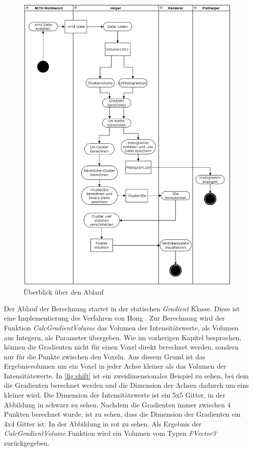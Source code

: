 \begin{figure}
\centering 
\includegraphics[width=\textwidth]{Logos/Ueberblick2.png}
\caption{Überblick über den Ablauf} 
\label{fig:ueberblick} 
\end{figure}


Der Ablauf der Berechnung startet in der statischen \textit{Gradient} Klasse. Diese ist eine Implementierung des Verfahren von Hong \cite{hong2003method}. Zur Berechnung wird der Funktion \textit{CalcGradientVolume} das Volumen der Intensitätswerte, als Volumen aus Integern, als Parameter übergeben. Wie im vorherigen Kapitel besprochen, können die Gradienten nicht für einen Voxel direkt berechnet werden, sondern nur für die Punkte zwischen den Voxeln. Aus diesem Grund ist das Ergebnisvolumen um ein Voxel in jeder Achse kleiner als das Volumen der Intensitätswerte. In \autoref{fig:shift} ist ein zweidimensionales Beispiel zu sehen, bei dem die Gradienten berechnet werden und die Dimension der Achsen dadurch um eins kleiner wird. Die Dimension der Intensitätswerte ist ein 5x5 Gitter, in der Abbildung in schwarz zu sehen. Nachdem die Gradienten immer zwischen 4 Punkten berechnet wurde, ist zu sehen, dass die Dimension der Gradienten ein 4x4 Gitter ist. In der Abbildung in rot zu sehen. Als Ergebnis der  \textit{CalcGradientVolume} Funktion wird ein Volumen vom Typen \textit{FVector3} zurückgegeben.



